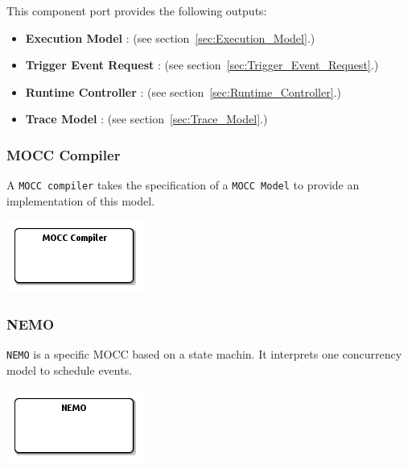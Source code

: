 \documentclass{gemoc} %
\begin{document}
This component port provides the following outputs:
\begin{itemize}
  \item \textbf{Execution Model} :
(see section~\ref{sec:Execution_Model}.)
  \item \textbf{Trigger Event Request} :
(see section~\ref{sec:Trigger_Event_Request}.)
  \item \textbf{Runtime Controller} :
(see section~\ref{sec:Runtime_Controller}.)
  \item \textbf{Trace Model} :
(see section~\ref{sec:Trace_Model}.)
\end{itemize}


\subsubsection{MOCC Compiler}
\label{sec:MOCC_Compiler}
A \texttt{MOCC compiler} takes the specification of a \texttt{MOCC Model} to provide an implementation of this model.
\begin{center}
\includegraphics*[trim=0.0cm 0.0cm 0cm 0.0cm, clip=true]{../images/generated/Generated_MOCC_Compiler.png}
\end{center}




\subsubsection{NEMO}
\label{sec:NEMO}

\texttt{NEMO} is a specific MOCC based on a state machin. It interprets one concurrency model to schedule events.
\begin{center}
\includegraphics*[trim=0.0cm 0.0cm 0cm 0.0cm, clip=true]{../images/generated/Generated_NEMO.png}
\end{center}
\end{document}
